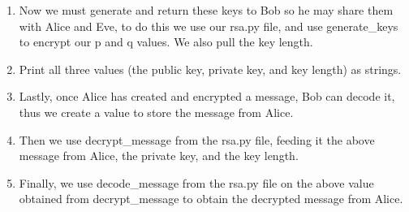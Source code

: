 \documentclass{article}
\begin{document}
\begin{enumerate}
            \TextField[width=6in,height=1in, bordercolor=0 0 0, name=p3q1, multiline=true]{}

        \item Now we must generate and return these keys to Bob so he may share them with Alice and Eve, to do this we use our rsa.py file, and use generate_keys to encrypt our p and q values. We also pull the key length.

            \TextField[width=6in,height=1in, bordercolor=0 0 0, name=p3q1, multiline=true]{}

        \item Print all three values (the public key, private key, and key length) as strings.

            \TextField[width=6in,height=1in, bordercolor=0 0 0, name=p3q1, multiline=true]{}

        \item Lastly, once Alice has created and encrypted a message, Bob can decode it, thus we create a value to store the message from Alice.

            \TextField[width=6in,height=1in, bordercolor=0 0 0, name=p3q1, multiline=true]{}

        \item Then we use decrypt_message from the rsa.py file, feeding it the above message from Alice, the private key, and the key length.

            \TextField[width=6in,height=1in, bordercolor=0 0 0, name=p3q1, multiline=true]{}

        \item Finally, we use decode_message from the rsa.py file on the above value obtained from decrypt_message to obtain the decrypted message from Alice.

            \TextField[width=6in,height=1in, bordercolor=0 0 0, name=p3q1, multiline=true]{}

    \end{enumerate}
\end{document}
